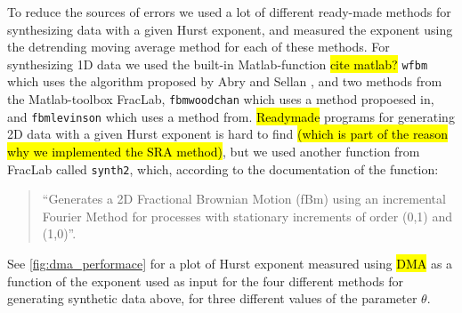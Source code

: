 To reduce the sources of errors we used a lot of different ready-made methods for synthesizing data with a given Hurst exponent, and measured the exponent using the detrending moving average method for each of these methods. For synthesizing 1D data we used the built-in Matlab-function \hl{cite matlab?} \Verb!wfbm! which uses the algorithm proposed by Abry and Sellan \cite{abry1996wavelet}, and two methods from the Matlab-toolbox FracLab\cite{fraclab_toolbox}, \Verb!fbmwoodchan! which uses a method propoesed in\cite{wood1994simulation}, and \Verb!fbmlevinson! which uses a method from\cite{levinson1947wiener}. \hl{Readymade} programs for generating 2D data with a given Hurst exponent is hard to find \hl{(which is part of the reason why we implemented the SRA method)}, but we used another function from FracLab called \Verb!synth2!, which, according to the documentation of the function:%
\begin{quote}
    ``Generates a 2D Fractional Brownian Motion (fBm) using an incremental Fourier Method for processes with stationary increments of order (0,1) and (1,0)''.
\end{quote}

See \cref{fig:dma_performace} for a plot of Hurst exponent measured using \hl{DMA} as a function of the exponent used as input for the four different methods for generating synthetic data above, for three different values of the parameter $\theta$.

